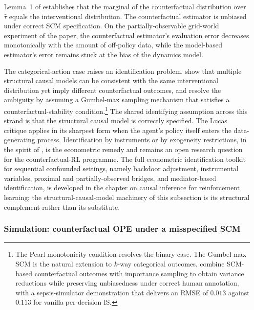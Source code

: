 Lemma~1 of \citet{Buesing2019} establishes that the marginal of the
counterfactual distribution over $\hat\tau$ equals the interventional
distribution. The counterfactual estimator is unbiased under correct SCM
specification. On the partially-observable grid-world experiment of the
paper, the counterfactual estimator's evaluation error decreases
monotonically with the amount of off-policy data, while the model-based
estimator's error remains stuck at the bias of the dynamics model.

The categorical-action case raises an identification problem.
\citet{Oberst2019} show that multiple structural causal models can be
consistent with the same interventional distribution yet imply different
counterfactual outcomes, and resolve the ambiguity by assuming a
Gumbel-max sampling mechanism that satisfies a counterfactual-stability
condition.\footnote{The Pearl monotonicity condition resolves the binary
case. The Gumbel-max SCM is the natural extension to $k$-way categorical
outcomes. \citet{TangWiens2023} combine SCM-based counterfactual outcomes
with importance sampling to obtain variance reductions while preserving
unbiasedness under correct human annotation, with a sepsis-simulator
demonstration that delivers an RMSE of $0.013$ against $0.113$ for vanilla
per-decision IS.} The shared identifying assumption across this strand is
that the structural causal model is correctly specified. The Lucas
critique applies in its sharpest form when the agent's policy itself
enters the data-generating process. Identification by instruments or by
exogeneity restrictions, in the spirit of \citet{Chernozhukov2018}, is the
econometric remedy and remains an open research question for the
counterfactual-RL programme. The full econometric identification toolkit
for sequential confounded settings, namely backdoor adjustment,
instrumental variables, proximal and partially-observed bridges, and
mediator-based identification, is developed in the chapter on causal
inference for reinforcement learning; the structural-causal-model
machinery of this subsection is its structural complement rather than its
substitute.

\subsubsection{Simulation: counterfactual OPE under a misspecified SCM}
\label{sec:cfope_sim}


